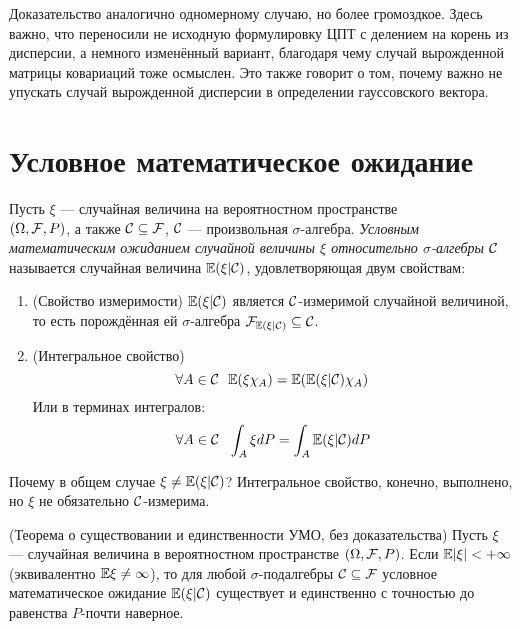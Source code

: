 \begin{note}
    Доказательство аналогично одномерному случаю, но более громоздкое. Здесь важно, что переносили не исходную формулировку ЦПТ с делением на корень из дисперсии, а немного изменённый вариант, благодаря чему случай вырожденной матрицы ковариаций тоже осмыслен. Это также говорит о том, почему важно не упускать случай вырожденной дисперсии в определении гауссовского вектора.
\end{note}

\section{Условное математическое ожидание}

\begin{definition}
    Пусть $\xi$ --- случайная величина на вероятностном пространстве \\ $(\Omega, \mathcal{F}, P)$, а также $\mathcal{C} \subseteq \mathcal{F}$, $\mathcal{C}$ --- произвольная $\sigma$-алгебра. \textit{Условным математическим ожиданием случайной величины $\xi$ относительно $\sigma$-алгебры $\mathcal{C}$} называется случайная величина $\mathbb{E}(\xi | \mathcal{C})$, удовлетворяющая двум свойствам:
    \begin{enumerate}
        \item (Свойство измеримости) $\mathbb{E}(\xi | \mathcal{C})$ является $\mathcal{C}$-измеримой случайной величиной, то есть порождённая ей $\sigma$-алгебра $\mathcal{F}_{\mathbb{E}(\xi | \mathcal{C})} \subseteq \mathcal{C}$.

        \item (Интегральное свойство)
        \[
            \forall A \in \mathcal{C} \ \ \mathbb{E}(\xi \chi_A) = \mathbb{E}(\mathbb{E}(\xi | \mathcal{C}) \chi_A)
        \]
        Или в терминах интегралов:
        \[
            \forall A \in \cC \ \ \int_A \xi dP = \int_A \E(\xi | \cC) dP
        \]
    \end{enumerate}
\end{definition}

\begin{note}
    Почему в общем случае $\xi \neq \mathbb{E}(\xi | \mathcal{C})$? Интегральное свойство, конечно, выполнено, но $\xi$ не обязательно $\mathcal{C}$-измерима.
\end{note}

\begin{theorem} (Теорема о существовании и единственности УМО, без доказательства)
    Пусть $\xi$ --- случайная величина в вероятностном пространстве $(\Omega, \mathcal{F}, P)$. Если $\mathbb{E}|\xi| < +\infty$ (эквивалентно $\mathbb{E}\xi \neq \infty$), то для любой $\sigma$-подалгебры $\mathcal{C} \subseteq \mathcal{F}$ условное математическое ожидание $\mathbb{E}(\xi | \mathcal{C})$ существует и единственно с точностью до равенства $P$-почти наверное.
\end{theorem}

